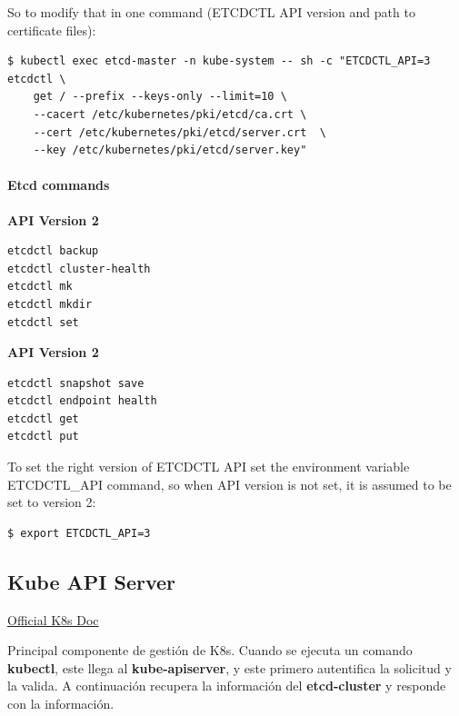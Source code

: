 \documentclass{article}
\newenvironment{codetemplate}[1][]{%
  \mybasecolorbox[#1]
  \itshape
}{%
  \endmybasecolorbox
}
\begin{document}
So to modify that in one command (ETCDCTL API version and path to certificate files):

\begin{codetemplate}{}
\begin{verbatim}
$ kubectl exec etcd-master -n kube-system -- sh -c "ETCDCTL_API=3 etcdctl \ 
    get / --prefix --keys-only --limit=10 \
    --cacert /etc/kubernetes/pki/etcd/ca.crt \
    --cert /etc/kubernetes/pki/etcd/server.crt  \
    --key /etc/kubernetes/pki/etcd/server.key"
\end{verbatim}
\end{codetemplate}

\paragraph{Etcd commands}

\textbf{API Version 2}

\begin{codetemplate}{}
\begin{verbatim}
etcdctl backup
etcdctl cluster-health
etcdctl mk
etcdctl mkdir
etcdctl set
\end{verbatim}
\end{codetemplate}

\textbf{API Version 2}

\begin{codetemplate}{}
\begin{verbatim}
etcdctl snapshot save 
etcdctl endpoint health
etcdctl get
etcdctl put
\end{verbatim}
\end{codetemplate}

To set the right version of ETCDCTL API set the environment variable ETCDCTL\_API command, so when API version is not set, it is assumed to be set to version 2:

\begin{codetemplate}{}
\begin{verbatim}
$ export ETCDCTL_API=3
\end{verbatim}
\end{codetemplate}

\subsection{Kube API Server}

\href{https://kubernetes.io/docs/reference/command-line-tools-reference/kube-apiserver/}{Official K8s Doc}

Principal componente de gestión de K8s. Cuando se ejecuta un comando \textbf{kubectl}, este llega al \textbf{kube-apiserver}, y este primero autentifica la solicitud y la valida. A continuación recupera la información del \textbf{etcd-cluster} y responde con la información.
\end{document}
